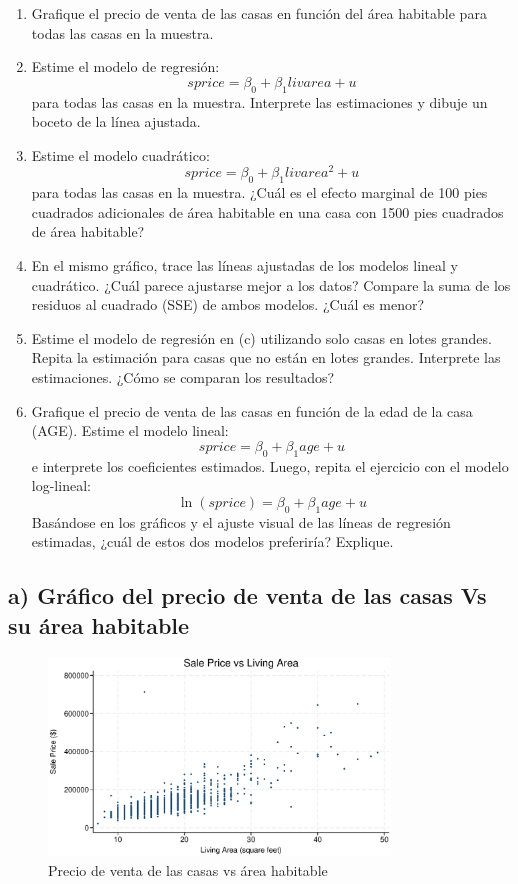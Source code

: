\documentclass[12pt]{article}
\begin{document}
\begin{enumerate}[label=\alph*)]
    \item Grafique el precio de venta de las casas en función del área habitable para todas las casas en la muestra.
    
    \item Estime el modelo de regresión: 
    \[
        sprice = \beta_0 + \beta_1 livarea + u
    \]
    para todas las casas en la muestra. Interprete las estimaciones y dibuje un boceto de la línea ajustada.
    
    \item Estime el modelo cuadrático:
    \[
        sprice = \beta_0 + \beta_1 livarea^2 + u
    \]
    para todas las casas en la muestra. ¿Cuál es el efecto marginal de 100 pies cuadrados adicionales de área habitable en una casa con 1500 pies cuadrados de área habitable?
    
    \item En el mismo gráfico, trace las líneas ajustadas de los modelos lineal y cuadrático. ¿Cuál parece ajustarse mejor a los datos? Compare la suma de los residuos al cuadrado (SSE) de ambos modelos. ¿Cuál es menor?
    
    \item Estime el modelo de regresión en (c) utilizando solo casas en lotes grandes. Repita la estimación para casas que no están en lotes grandes. Interprete las estimaciones. ¿Cómo se comparan los resultados?
    
    \item Grafique el precio de venta de las casas en función de la edad de la casa (AGE). Estime el modelo lineal:
    \[
        sprice = \beta_0 + \beta_1 age + u
    \]
    e interprete los coeficientes estimados. Luego, repita el ejercicio con el modelo log-lineal: 
    \[
        \ln(sprice) = \beta_0 + \beta_1 age + u
    \]
    Basándose en los gráficos y el ajuste visual de las líneas de regresión estimadas, ¿cuál de estos dos modelos preferiría? Explique.
\end{enumerate}

\subsection*{a) Gráfico del precio de venta de las casas Vs su área habitable}

\begin{figure}[h!]
\centering
\includegraphics[width=0.81\textwidth]{Figures/0205-scatter_basic.eps}
\caption{Precio de venta de las casas vs área habitable}
\label{fig:0205-scatter_basic}
\end{figure}
\end{document}
